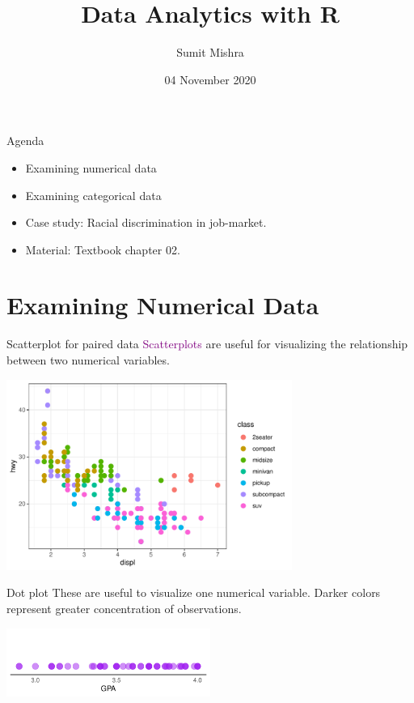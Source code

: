 \documentclass[notes,11pt, aspectratio=169]{beamer}
\title[DAR]{Data Analytics with R}  %
\author{Sumit Mishra} %
\institute[IFMR] %
{
Institute for Financial Management and Research, Sri City \\ %
\medskip
\medskip
\textbf{Summarizing Data} %
}
\date{04 November 2020} %
\begin{document}
\begin{frame}
  \titlepage
\end{frame}

\begin{frame}{Agenda}
\begin{itemize}
\item Examining numerical data
\item Examining categorical data
\item Case study: Racial discrimination in job-market.
\item Material: Textbook chapter 02.
\end{itemize}
\end{frame}


\section{Examining Numerical Data}
\begin{frame}{Scatterplot for paired data}
\textcolor{purple}{Scatterplots} are useful for visualizing the relationship between two numerical variables.
\begin{center}
\includegraphics[width=0.7\textwidth]{graphs/l02f01.pdf}
\end{center}
\end{frame}


\begin{frame}{Dot plot}
These are useful to visualize one numerical variable. Darker colors represent greater concentration of observations.
\begin{center}
\includegraphics[width=0.5\textwidth]{graphs/l02f02.pdf}
\end{center}
\end{frame}
\end{document}
